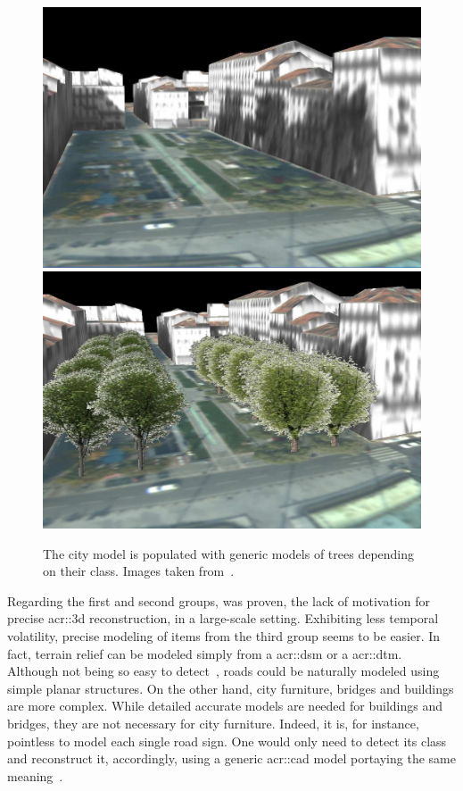             \begin{figure}[htpb]
                \centering
                \includegraphics[width=.45\textwidth]{images/introduction/modeling_trees_1}
                \includegraphics[width=.45\textwidth]{images/introduction/modeling_trees_2}
                \caption[
                    The city model is populated with generic models of trees depending on their class.
                ]{
                    \label{fig::3d_tree_models}
                    The city model is populated with generic models of trees depending on their class.
                    Images taken from~\parencite{iovan2008detection}.
                }
            \end{figure}
            Regarding the first and second groups, was proven, the lack of motivation for precise \gls{acr::3d} reconstruction, in a large-scale setting.
            Exhibiting less temporal volatility, precise modeling of items from the third group seems to be easier.
            In fact, terrain relief can be modeled simply from a \acrfull{acr::dsm} or a \gls{acr::dtm}.
            Although not being so easy to detect~\parencite{mnih2010learning}, roads could be naturally modeled using simple planar structures.
            On the other hand, city furniture, bridges and buildings are more complex.
            While detailed accurate models are needed for buildings and bridges, they are not necessary for city furniture.
            Indeed, it is, for instance, pointless to model each single road sign.
            One would only need to detect its class and reconstruct it, accordingly, using a generic \gls{acr::cad} model portaying the same meaning~\parencite{soheilian2013detection}.\\
